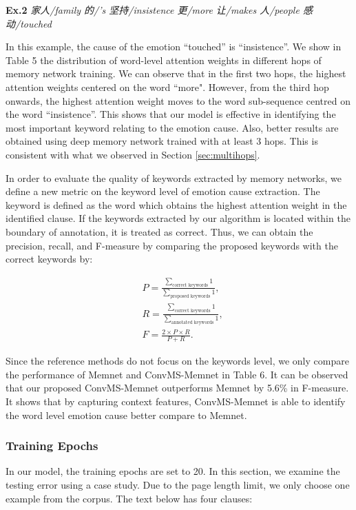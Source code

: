 \documentclass[11pt,letterpaper]{article}
\begin{document}
\begin{CJK*}{UTF8}{gbsn}
\noindent \textbf{Ex.2} \emph{家人/family 的/'s 坚持/insistence 更/more 让/makes 人/people 感动/touched}

In this example, the cause of the emotion ``touched'' is ``insistence''. We show in Table 5 the distribution of word-level attention weights in different hops of memory network training. We can observe that in the first two hops, the highest attention weights centered on the word ``more". However, from the third hop onwards, the highest attention weight moves to the word sub-sequence centred on the word ``insistence''. This shows that our model is effective in identifying the most important keyword relating to the emotion cause. Also, better results are obtained using deep memory network trained with at least 3 hops. This is consistent with what we observed in Section \ref{sec:multihops}.

In order to evaluate the quality of keywords extracted by memory networks, we define a new metric on the keyword level of emotion cause extraction. The keyword is defined as the word which obtains the highest attention weight in the identified clause. If the keywords extracted by our algorithm is located within the boundary of annotation, it is treated as correct. Thus, we can obtain the precision, recall, and F-measure by comparing the proposed keywords with the correct keywords by:


\begin{align*}
&P=\frac{\sum_{\mbox{correct keywords}} 1}{\sum_{\mbox{proposed keywords}} 1}, \\
&R=\frac{\sum_{\mbox{correct keywords}} 1}{\sum_{\mbox{annotated keywords}} 1}, \\
&F=\frac{2 \times P \times R}{P+R}.
\end{align*}

Since the reference methods do not focus on the keywords level, we only compare the performance of Memnet and ConvMS-Memnet in Table 6. It can be observed that our proposed ConvMS-Memnet outperforms Memnet by 5.6\% in F-measure. It shows that by capturing context features, ConvMS-Memnet is able to identify the word level emotion cause better compare to Memnet.




\subsubsection{Training Epochs}
\label{sec:trainIterations}

In our model, the training epochs are set to 20. In this section, we examine the testing error using a case study. Due to the page length limit, we only choose one example from the corpus. The text below has four clauses:


\end{CJK*}
\end{document}
